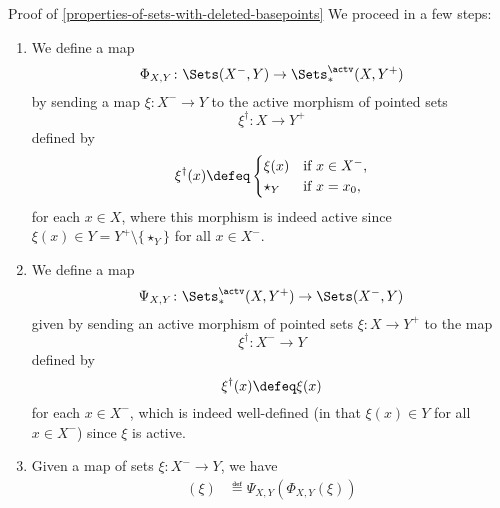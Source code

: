 \begin{Proof}{Proof of \cref{properties-of-sets-with-deleted-basepoints}}
    We proceed in a few steps:
    \begin{enumerate}
        \item\label{proof-of-properties-of-sets-with-deleted-basepoints-adjoint-equivalence-1}We define a map
            \[
                \Phi_{X,Y}%
                \colon%
                \Sets(X^{-},Y)%
                \to%
                \Sets^{\actv}_{*}(X,Y^{+})%
            \]%
            by sending a map $\xi\colon X^{-}\to Y$ to the active morphism of pointed sets%
            \[
                \xi^{\dagger}%
                \colon%
                X%
                \to%
                Y^{+}%
            \]%
            defined by
            \[
                \xi^{\dagger}(x)%
                \defeq
                \begin{cases}
                    \xi(x)    &\text{if $x\in X^{-}$,}\\
                    \star_{Y} &\text{if $x=x_{0}$,}
                \end{cases}
            \]%
            for each $x\in X$, where this morphism is indeed active since $\xi(x)\in Y=Y^{+}\setminus\{\star_{Y}\}$ for all $x\in X^{-}$.
        \item\label{proof-of-properties-of-sets-with-deleted-basepoints-adjoint-equivalence-2}We define a map
            \[
                \Psi_{X,Y}%
                \colon%
                \Sets^{\actv}_{*}(X,Y^{+})%
                \to%
                \Sets(X^{-},Y)%
            \]%
            given by sending an active morphism of pointed sets $\xi\colon X\to Y^{+}$ to the map
            \[
                \xi^{\dagger}%
                \colon%
                X^{-}%
                \to%
                Y%
            \]%
            defined by
            \[
                \xi^{\dagger}(x)%
                \defeq%
                \xi(x)
            \]%
            for each $x\in X^{-}$, which is indeed well-defined (in that $\xi(x)\in Y$ for all $x\in X^{-}$) since $\xi$ is active.
        \item\label{proof-of-properties-of-sets-with-deleted-basepoints-adjoint-equivalence-3}Given a map of sets $\xi\colon X^{-}\to Y$, we have
            \begin{align*}
                [\Psi_{X,Y}\circ\Phi_{X,Y}](\xi) &\eqdef \Psi_{X,Y}(\Phi_{X,Y}(\xi))\\%

\end{align*}
\end{enumerate}
\end{Proof}
